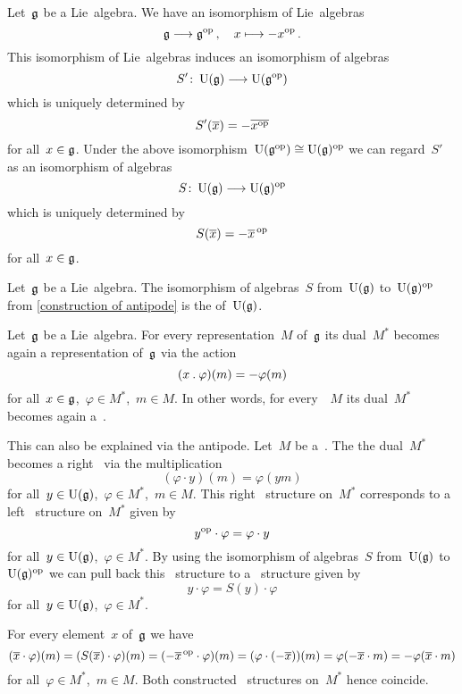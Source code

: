 \begin{construction}
  \label{construction of antipode}
  Let~$\mathfrak{g}$ be a Lie~algebra.
  We have an isomorphism of Lie~algebras
  \[
    \glie
    \to
    \glie^{\op} \,,
    \quad
    x
    \mapsto
    - x^{\op} \,.
  \]
  This isomorphism of Lie~algebras induces an isomorphism of algebras
  \[
    S'
    \colon
    \Univ( \glie )
    \to
    \Univ( \glie^{\op} )
  \]
  which is uniquely determined by
  \[
    S'( \overline{x} )
    =
    - \overline{ x^{\mathrm{op}} }
  \]
  for all~$x \in \mathfrak{g}$.
  Under the above isomorphism~$\operatorname{U}( \mathfrak{g}^{\mathrm{op}} ) \cong \operatorname{U}(\mathfrak{g})^{\mathrm{op}}$ we can regard~$S'$ as an isomorphism of algebras
  \[
    S
    \colon
    \Univ( \glie )
    \to
    \Univ( \glie )^{\op}
  \]
  which is uniquely determined by
  \[
    S( \overline{x} )
    =
    - \overline{x}^{\,\mathrm{op}}
  \]
  for all~$x \in \mathfrak{g}$.
\end{construction}


\begin{definition}
  Let~$\mathfrak{g}$ be a Lie~algebra.
  The isomorphism of algebras~$S$ from~$\Univ(\glie)$ to~$\Univ(\glie)^{\op}$ from \cref{construction of antipode} is the  of~$\Univ(\glie)$.
\end{definition}


\begin{remark}
  Let~$\mathfrak{g}$ be a Lie~algebra.
  For every representation~$M$ of~$\mathfrak{g}$ its dual~$M^*$ becomes again a representation of~$\mathfrak{g}$ via the action
  \[
    (x \mathbin{.} \varphi)(m)
    =
    - \varphi(m)
  \]
  for all~$x \in \mathfrak{g}$,~$\varphi \in M^*$,~$m \in M$.
  In other words, for every~\module{$\Univ(\glie)$}~$M$ its dual~$M^*$ becomes again a~\module{$\Univ(\glie)$}.

  This can also be explained via the antipode.
  Let~$M$ be a~\module{$\Univ(\glie)$}.
  The the dual~$M^*$ becomes a right~\module{$\Univ(\glie)$} via the multiplication
  \[
    (\varphi \cdot y)(m)
    =
    \varphi(ym)
  \]
  for all~$y \in \operatorname{U}(\mathfrak{g})$,~$\varphi \in M^*$,~$m \in M$.
  This right~\module{$\Univ(\glie)$} structure on~$M^*$ corresponds to a left~\module{$\Univ(\glie)^{\op}$} structure on~$M^*$ given by
  \[
    y^{\mathrm{op}} \cdot \varphi
    =
    \varphi \cdot y
  \]
  for all~$y \in \operatorname{U}(\mathfrak{g})$,~$\varphi \in M^*$.
  By using the isomorphism of algebras~$S$ from~$\Univ(\glie)$ to~$\Univ(\glie)^{\op}$ we can pull back this~\module{$\Univ(\glie)^{\op}$} structure to a~\module{$\Univ(\glie)$} structure given by
  \[
    y \cdot \varphi
    =
    S(y) \cdot \varphi
  \]
  for all~$y \in \operatorname{U}(\mathfrak{g})$,~$\varphi \in M^*$.

  For every element~$x$ of~$\mathfrak{g}$ we have
  \[
    (\overline{x} \cdot \varphi)(m)
    =
    ( S(\overline{x}) \cdot \varphi )(m)
    =
    ( - \overline{x}^{\,\mathrm{op}} \cdot \varphi )(m)
    =
    ( \varphi \cdot (- \overline{x}) )(m)
    =
    \varphi( - \overline{x} \cdot m )
    =
    - \varphi( \overline{x} \cdot m )
  \]
  for all~$\varphi \in M^*$,~$m \in M$.
  Both constructed~\module{$\Univ(\glie)$} structures on~$M^*$ hence coincide.
\end{remark}



